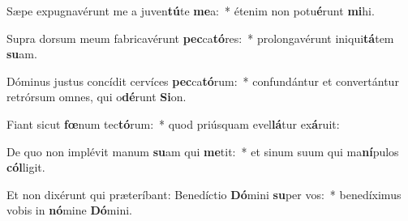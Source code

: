 \item Sæpe expugnavérunt me a juven\textbf{tú}te \textbf{me}a:~* étenim non potu\textbf{é}runt \textbf{mi}hi.
\item Supra dorsum meum fabricavérunt \textbf{pec}ca\textbf{tó}res:~* prolongavérunt iniqui\textbf{tá}tem \textbf{su}am.
\item Dóminus justus concídit cervíces \textbf{pec}ca\textbf{tó}rum:~* confundántur et convertántur retrórsum omnes, qui o\textbf{dé}runt \textbf{Si}on.
\item Fiant sicut \textbf{fœ}num tec\textbf{tó}rum:~* quod priúsquam evel\textbf{lá}tur ex\textbf{á}ruit:
\item De quo non implévit manum \textbf{su}am qui \textbf{me}tit:~* et sinum suum qui ma\textbf{ní}pulos \textbf{cól}ligit.
\item Et non dixérunt qui præteríbant: Benedíctio \textbf{Dó}mini \textbf{su}per vos:~* benedíximus vobis in \textbf{nó}mine \textbf{Dó}mini.
